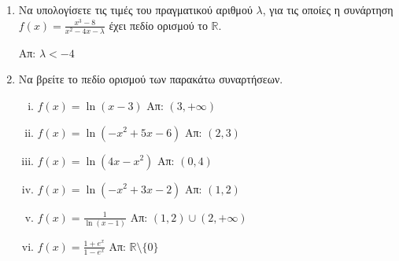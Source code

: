 \documentclass[a4paper,table]{report}
\begin{document}
\begin{enumerate}
    \item Να υπολογίσετε τις τιμές του πραγματικού αριθμού $ \lambda $, για τις 
        οποίες η συνάρτηση $ f(x) = \frac{x^{3}-8}{x^{2}-4x- \lambda} $ έχει πεδίο 
        ορισμού το $ \mathbb{R} $.

        \hfill Απ: $ \lambda < -4 $ 

    \item  Να βρείτε το πεδίο ορισμού των παρακάτω συναρτήσεων.
        \begin{enumerate}[i)]
            \item $ f(x) = \ln{(x-3)} $ \hfill Απ: $(3,+\infty)$
            \item $ f(x) = \ln{(-x^{2}+5x-6)} $ \hfill Απ: $ (2,3) $
            \item $ f(x) = \ln{(4x-x^{2})} $ \hfill Απ: $ (0,4) $
            \item $ f(x) = \ln{(-x^{2}+3x-2)} $ \hfill Απ: $ (1,2) $ 
            \item $ f(x) = \frac{1}{\ln{(x-1)}} $ \hfill Απ: $ (1,2) \cup (2,+\infty) $ 
            \item $ f(x) = \frac{1+e^{x}}{1-e^{x}} $ \hfill Απ: 
                $ \mathbb{R} \setminus \{ 0 \} $ 
        \end{enumerate}


\end{enumerate}
\end{document}
